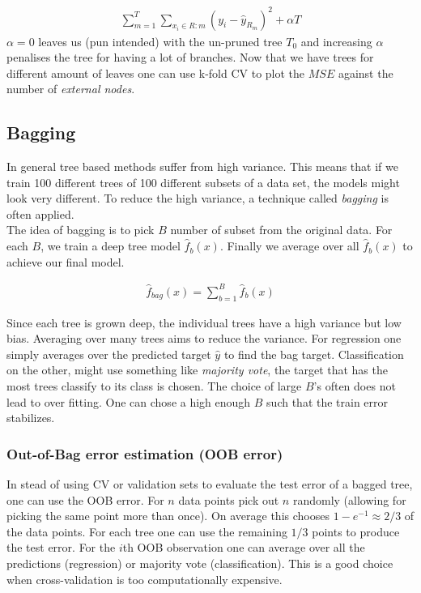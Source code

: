 \documentclass{article}
\begin{document}
\begin{align*}
    \sum_{m=1}^{T}\sum_{x_i \in R:m} (y_i - \hat{y}_{R_m})^2 + \alpha T
\end{align*}
$\alpha = 0$ leaves us (pun intended) with the un-pruned tree $T_0$ and increasing $\alpha$ penalises the tree for having a lot of branches. Now that we have trees for different amount of leaves one can use k-fold CV to plot the $MSE$ against the number of \textit{external nodes}.

\subsection{Bagging}
In general tree based methods suffer from high variance. This means that if we train 100 different trees of 100 different subsets of a data set, the models might look very different. To reduce the high variance, a technique called \textit{bagging} is often applied.
\\
The idea of bagging is to pick $B$ number of subset from the original data. For each $B$, we train a deep tree model $\hat{f}_b(x)$. Finally we average over all $\hat{f}_b(x)$ to achieve our final model.

\begin{align*}
    \hat{f}_{bag} (x)= \sum_{b=1}^{B} \hat{f}_b (x)
\end{align*}

Since each tree is grown deep, the individual trees have a high variance but low bias. Averaging over many trees aims to reduce the variance. For regression one simply averages over the predicted target $\hat{y}$ to find the bag target. Classification on the other, might use something like \textit{majority vote}, the target that has the most trees classify to its class is chosen. The choice of large $B$'s often does not lead to over fitting. One can chose a high enough $B$ such that the train error stabilizes.  

\subsubsection{Out-of-Bag error estimation (OOB error)}
In stead of using CV or validation sets to evaluate the test error of a bagged tree, one can use the OOB error. For $n$ data points pick out $n$ randomly (allowing for picking the same point more than once). On average this chooses $1-e^{-1} \approx 2/3$ of the data points. For each tree one can use the remaining $1/3$ points to produce the test error. For the $i$th OOB observation one can average over all the predictions (regression) or majority vote (classification). This is a good choice when cross-validation is too computationally expensive.
\end{document}
